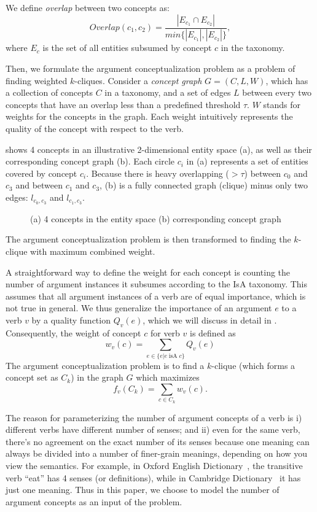 We define {\em overlap} between two concepts as:
$$Overlap(c_1,c_2)=\frac{|E_{c_1}\cap E_{c_2}|}{min\{ |E_{c_1}|,|E_{c_2}| \}},$$
where $E_c$ is the set of all entities subsumed by concept $c$ in
the taxonomy.

Then, we formulate the argument conceptualization problem as
a problem of finding weighted $k$-cliques. Consider a \emph{concept graph}
$G=(C,L,W)$, which has a collection of concepts $C$ in a taxonomy,
and a set of edges $L$ between every two concepts that
have an overlap less than a predefined threshold $\tau$. $W$ stands for
weights for the concepts in the graph.
Each weight intuitively represents the quality of
the concept with respect to the verb.

 shows 4 concepts in an illustrative 2-dimensional
entity space (a), as well as their corresponding concept graph (b).
Each circle $c_i$ in (a) represents a set of entities covered by concept $c_i$.
Because there is heavy overlapping ($>\tau$) between $c_0$ and $c_3$
and between $c_1$ and $c_3$, (b) is a fully connected graph (clique) minus only
two edges: $l_{c_0,c_3}$ and $l_{c_1, c_3}$.

\begin{figure}[th]
\centering
{}
\caption{(a) 4 concepts in the entity space
(b) corresponding concept graph
}
\label{fig:graph_model}
\end{figure}

The argument conceptualization problem is then transformed to
finding the $k$-clique with maximum combined weight.

A straightforward way to define the weight for each concept is
counting the number of argument instances it subsumes according to the
IsA taxonomy. This assumes that all argument instances of a verb are of
equal importance, which is not true in general.
We thus generalize the importance of an argument $e$ to a verb $v$
by a quality function $Q_v(e)$, which we will discuss in detail
in .
Consequently, the weight of concept $c$ for verb $v$ is
defined as
\begin{equation}
w_v(c)=\sum_{e\in \{e|e\;\text{isA}\;c\}}{Q_v(e)}
\end{equation}
The argument conceptualization problem is to find
a $k$-clique (which forms a concept set as $C_k$)
in the graph $G$ which maximizes
\begin{equation}
\label{eq:f}
f_v(C_k)=\sum_{c\in C_k}{w_v(c)}.
\end{equation}

The reason for parameterizing the number of argument concepts of a
verb is i) different verbs have different number of senses; and ii)
even for the same verb, there's no agreement on the exact number of its
senses because one meaning can always be divided into a number of
finer-grain meanings, depending on how you view the semantics.
For example, in Oxford English Dictionary~\cite{oxford},
the transitive verb ``eat'' has 4 senses (or definitions),
while in Cambridge Dictionary~\cite{cambridge} it has just one meaning.
Thus in this paper, we choose
to model the number of argument concepts as an input of the problem.
